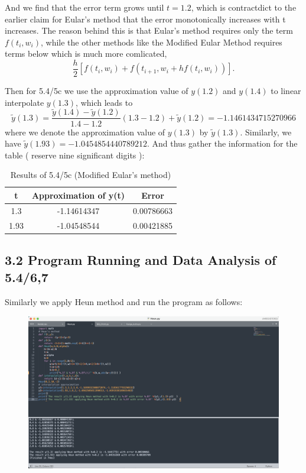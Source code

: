 \documentclass{article}
\begin{document}
    And we find that the error term grows until $t=1.2$, which is contractdict to the earlier claim for Eular's method that the error monotonically increases with t increases. The reason behind this is that Eular's method requires only the term $f(t_i,w_i)$, while the other methods like the Modified Eular Method requires terms below which is much more comlicated,
    $$ \frac{h}{2}[f(t_{i},w_{i})+f(t_{i+1},w_{i}+hf(t_i,w_i))].
    $$

    Then for  5.4/5c we use the approximation value of $y(1.2)$ and $y(1.4)$ to linear interpolate $y(1.3)$, which leads to 
    $$ \tilde{y}(1.3)=\frac{\tilde{y}(1.4)-\tilde{y}(1.2)}{1.4-1.2}(1.3-1.2)+\tilde{y}(1.2)=-1.1461434715270966
    $$
    where we denote the approximation value of $y(1.3)$ by $\tilde{y}(1.3)$.
    Similarly, we have $\tilde{y}(1.93)=-1.0454854440789212$. And thus gather the information for the table ( reserve nine significant digits ):
    \begin{table}[htbp]
    \centering
    \caption{Results of 5.4/5c (Modified Eular's method)}
    \begin{tabular}{c|c|c}
    \toprule
    t& \textbf{Approximation of y(t)} & \textbf{Error} \\ 
    \midrule
    1.3 & -1.14614347 & 0.00786663 \\
    1.93 & -1.04548544 & 0.00421885 \\
    \bottomrule
    \end{tabular}
    \end{table}

\subsection{3.2 Program Running and Data Analysis of 5.4/6,7} 

    Similarly we apply Heun method and run the program as follows:

    \begin{figure}[h]
    \centering
    \includegraphics[scale=0.22]{Program3}
    \end{figure}
\end{document}
